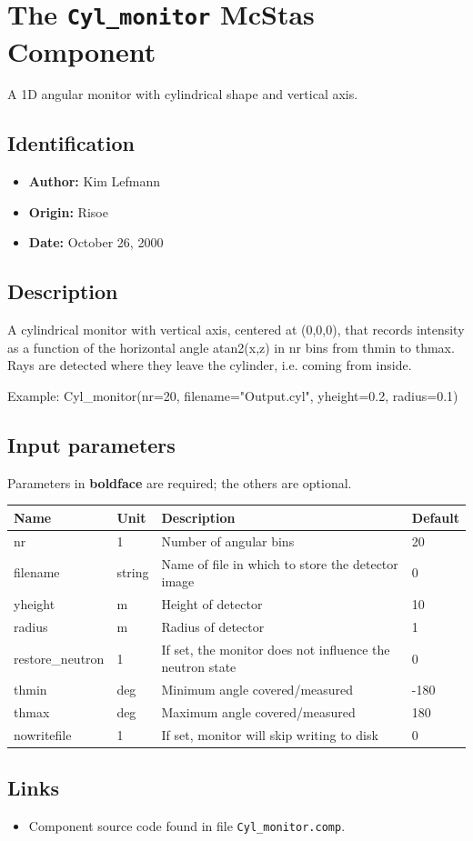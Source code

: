 \section{The \texttt{Cyl\_monitor} McStas Component}
A 1D angular monitor with cylindrical shape and vertical axis.

\subsection*{Identification}
\begin{itemize}
  \item \textbf{Author:} Kim Lefmann
  \item \textbf{Origin:} Risoe
  \item \textbf{Date:} October 26, 2000
\end{itemize}

\subsection*{Description}
A cylindrical monitor with vertical axis, centered at (0,0,0), that records intensity as a function of the horizontal angle atan2(x,z) in nr bins from thmin to thmax. Rays are detected where they leave the cylinder, i.e. coming from inside.

Example: Cyl\_monitor(nr=20, filename="Output.cyl", yheight=0.2, radius=0.1)

\subsection*{Input parameters}
Parameters in \textbf{boldface} are required; the others are optional.

\begin{longtable}{p{}p{}p{}p{}}
\toprule
\textbf{Name} & \textbf{Unit} & \textbf{Description} & \textbf{Default} \\
\midrule
\endhead
nr & 1 & Number of angular bins & 20 \\
filename & string & Name of file in which to store the detector image & 0 \\
yheight & m & Height of detector & 10 \\
radius & m & Radius of detector & 1 \\
restore\_neutron & 1 & If set, the monitor does not influence the neutron state & 0 \\
thmin & deg & Minimum angle covered/measured & -180 \\
thmax & deg & Maximum angle covered/measured & 180 \\
nowritefile & 1 & If set, monitor will skip writing to disk & 0 \\
\bottomrule
\end{longtable}

\subsection*{Links}
\begin{itemize}
  \item Component source code found in file \texttt{Cyl\_monitor.comp}.
\end{itemize}
